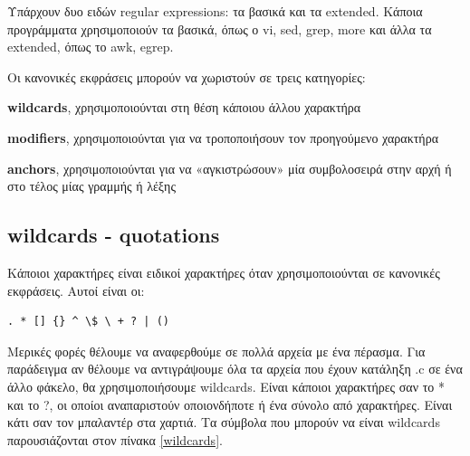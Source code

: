 Υπάρχουν δυο ειδών regular expressions: τα βασικά και τα extended. Κάποια προγράμματα χρησιμοποιούν τα βασικά, όπως ο vi, sed, grep, more και άλλα τα extended, όπως το awk, egrep.

Οι κανονικές εκφράσεις μπορούν να χωριστούν σε τρεις κατηγορίες:
\begin{packed_item}
	\item \textbf{wildcards}, χρησιμοποιούνται στη θέση κάποιου άλλου χαρακτήρα
	\item \textbf{modifiers}, χρησιμοποιούνται για να τροποποιήσουν τον προηγούμενο χαρακτήρα
	\item \textbf{anchors}, χρησιμοποιούνται για να «αγκιστρώσουν» μία συμβολοσειρά στην αρχή ή στο τέλος μίας γραμμής ή λέξης
\end{packed_item}

\subsection{wildcards - quotations}

Κάποιοι χαρακτήρες είναι ειδικοί χαρακτήρες όταν χρησιμοποιούνται σε κανονικές εκφράσεις. Αυτοί είναι οι:
\begin{lstlisting}
. * [] {} ^ \$ \ + ? | ()
\end{lstlisting}


Μερικές φορές θέλουμε να αναφερθούμε σε πολλά αρχεία με ένα πέρασμα. Για παράδειγμα αν θέλουμε να αντιγράψουμε όλα τα αρχεία που έχουν
κατάληξη .c σε ένα άλλο φάκελο, θα χρησιμοποιήσουμε wildcards. Είναι κάποιοι χαρακτήρες σαν το * και το ?, οι οποίοι αναπαριστούν
οποιονδήποτε ή ένα σύνολο από χαρακτήρες. Είναι κάτι σαν τον μπαλαντέρ στα χαρτιά. Τα σύμβολα που μπορούν να είναι wildcards παρουσιάζονται
στον πίνακα \ref{wildcards}.

